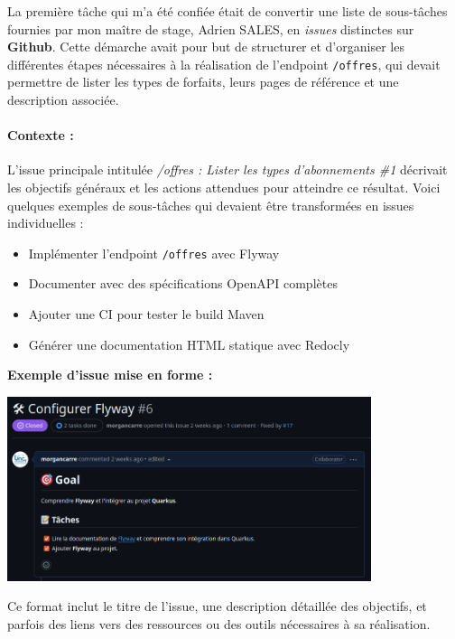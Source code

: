 \documentclass[11pt]{article}
\begin{document}
		La première tâche qui m’a été confiée était de convertir une liste de sous-tâches fournies par mon maître de stage, Adrien SALES, en \textit{issues} distinctes sur \textbf{Github}. Cette démarche avait pour but de structurer et d’organiser les différentes étapes nécessaires à la réalisation de l’endpoint \texttt{/offres}, qui devait permettre de lister les types de forfaits, leurs pages de référence et une description associée.
		
		\paragraph{Contexte : }
		
		L’issue principale intitulée \textit{/offres : Lister les types d'abonnements \#1} décrivait les objectifs généraux et les actions attendues pour atteindre ce résultat. Voici quelques exemples de sous-tâches qui devaient être transformées en issues individuelles :
		
		\begin{itemize}
			\item Implémenter l'endpoint \texttt{/offres} avec Flyway
			\item Documenter avec des spécifications OpenAPI complètes
			\item Ajouter une CI pour tester le build Maven
			\item Générer une documentation HTML statique avec Redocly
		\end{itemize}
		\begin{center}
			\textbf{Exemple d'issue mise en forme :}
		\end{center}
		\begin{center}
			\includegraphics[width=0.8\textwidth]{asset/ex_issue.png}
		\end{center}
		
		Ce format inclut le titre de l’issue, une description détaillée des objectifs, et parfois des liens vers des ressources ou des outils nécessaires à sa réalisation.
		
\end{document}
